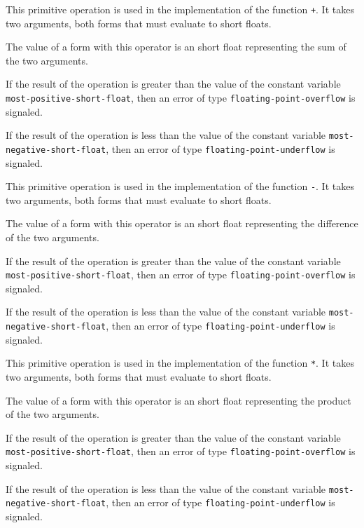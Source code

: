 
This primitive operation is used in the implementation of the
\commonlisp{} function \texttt{+}.  It takes two arguments, both forms
that must evaluate to short floats.

The value of a form with this operator is an short float
representing the sum of the two arguments.

If the result of the operation is greater than the value of the
constant variable \texttt{most-positive-short-float}, then an error of
type \texttt{floating-point-overflow} is signaled.

If the result of the operation is less than the value of the
constant variable \texttt{most-negative-short-float}, then an error of
type \texttt{floating-point-underflow} is signaled.


This primitive operation is used in the implementation of the
\commonlisp{} function \texttt{-}.  It takes two arguments, both forms
that must evaluate to short floats.

The value of a form with this operator is an short float
representing the difference of the two arguments.

If the result of the operation is greater than the value of the
constant variable \texttt{most-positive-short-float}, then an error of
type \texttt{floating-point-overflow} is signaled.

If the result of the operation is less than the value of the
constant variable \texttt{most-negative-short-float}, then an error of
type \texttt{floating-point-underflow} is signaled.


This primitive operation is used in the implementation of the
\commonlisp{} function \texttt{*}.  It takes two arguments, both forms
that must evaluate to short floats.

The value of a form with this operator is an short float
representing the product of the two arguments.

If the result of the operation is greater than the value of the
constant variable \texttt{most-positive-short-float}, then an error of
type \texttt{floating-point-overflow} is signaled.

If the result of the operation is less than the value of the constant
variable \texttt{most-negative-short-float}, then an error of type
\texttt{floating-point-underflow} is signaled.

